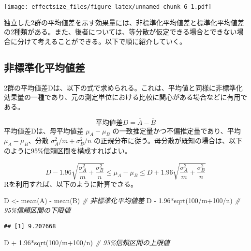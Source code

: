 \documentclass[
  ja=standard, xelatex, base=12pt]{bxjsreport}
\newenvironment{Shaded}{\begin{snugshade}}{\end{snugshade}}
\newcommand{\CommentTok}[1]{\textcolor[rgb]{0.56,0.35,0.01}{\textit{#1}}}
\newcommand{\DecValTok}[1]{\textcolor[rgb]{0.00,0.00,0.81}{#1}}
\newcommand{\FloatTok}[1]{\textcolor[rgb]{0.00,0.00,0.81}{#1}}
\newcommand{\FunctionTok}[1]{\textcolor[rgb]{0.00,0.00,0.00}{#1}}
\newcommand{\NormalTok}[1]{#1}
\newcommand{\OtherTok}[1]{\textcolor[rgb]{0.56,0.35,0.01}{#1}}
\newcommand{\SpecialCharTok}[1]{\textcolor[rgb]{0.00,0.00,0.00}{#1}}
\begin{document}
\texttt{[image: effectsize\_files/figure-latex/unnamed-chunk-6-1.pdf]}

独立した2群の平均値差を示す効果量には、非標準化平均値差と標準化平均値差の2種類がある。また、後者については、等分散が仮定できる場合とできない場合に分けて考えることができる。以下で順に紹介していく。

\hypertarget{ux975eux6a19ux6e96ux5316ux5e73ux5747ux5024ux5dee}{%
\subsection{非標準化平均値差}\label{ux975eux6a19ux6e96ux5316ux5e73ux5747ux5024ux5dee}}

2群の平均値差Dは、以下の式で求められる。これは、平均値と同様に非標準化効果量の一種であり、元の測定単位における比較に関心がある場合などに有用である。

\[
平均値差D=\bar{A}-\bar{B}
\] 平均値差Dは、母平均値差 \(\mu_A-\mu_B\) の一致推定量かつ不偏推定量であり、平均\(\mu_A-\mu_B\)、分散 \(\sigma_A^2/m+\sigma_B^2/n\) の正規分布に従う。母分散が既知の場合は、以下のように95\%信頼区間を構成すればよい。

\[
D-1.96\sqrt{\frac{\sigma_A^2}{m}+\frac{\sigma_B^2}{n}}\leq\mu_A-\mu_B\leq D+1.96\sqrt{\frac{\sigma_A^2}{m}+\frac{\sigma_B^2}{n}}
\] Rを利用すれば、以下のように計算できる。

\begin{Shaded}
\begin{Highlighting}[]
\NormalTok{D }\OtherTok{\textless{}{-}} \FunctionTok{mean}\NormalTok{(A) }\SpecialCharTok{{-}} \FunctionTok{mean}\NormalTok{(B)     }\CommentTok{\# 非標準化平均値差}
\NormalTok{D }\SpecialCharTok{{-}} \FloatTok{1.96}\SpecialCharTok{*}\FunctionTok{sqrt}\NormalTok{(}\DecValTok{100}\SpecialCharTok{/}\NormalTok{m}\SpecialCharTok{+}\DecValTok{100}\SpecialCharTok{/}\NormalTok{n) }\CommentTok{\# 95\%信頼区間の下限値}
\end{Highlighting}
\end{Shaded}

\begin{verbatim}
## [1] 9.207668
\end{verbatim}

\begin{Shaded}
\begin{Highlighting}[]
\NormalTok{D }\SpecialCharTok{+} \FloatTok{1.96}\SpecialCharTok{*}\FunctionTok{sqrt}\NormalTok{(}\DecValTok{100}\SpecialCharTok{/}\NormalTok{m}\SpecialCharTok{+}\DecValTok{100}\SpecialCharTok{/}\NormalTok{n) }\CommentTok{\# 95\%信頼区間の上限値}
\end{Highlighting}
\end{Shaded}
\end{document}
